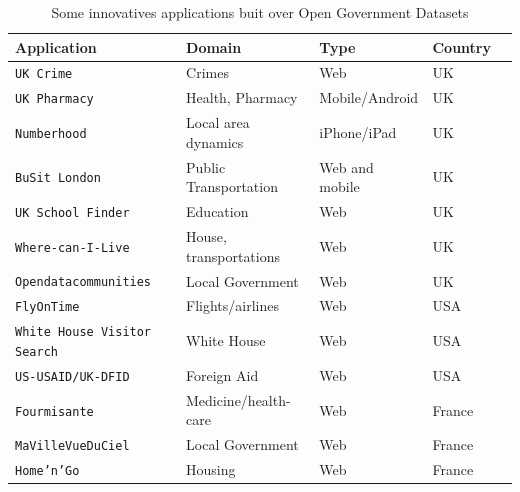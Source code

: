 \begin{table}[ht!b]
    \caption{Some innovatives applications buit over Open Government Datasets} \label{tab:apps-survey}
    \small
    \center
   \begin{tabularx}{\textwidth}{@{}llllX@{}}
    \toprule
    \textbf{Application} & \textbf{Domain} & \textbf{Type} &  \textbf{Country}  \\
    \toprule
    \texttt{UK Crime} &	Crimes & Web & UK  \\
    \midrule
\texttt{UK Pharmacy} & Health, Pharmacy  & Mobile/Android  & UK \\ 
	\midrule
	\texttt{Numberhood} & Local area dynamics  & iPhone/iPad & UK \\
	
	\midrule
	\texttt{BuSit London} & Public Transportation  & Web and mobile  & UK \\
	
	\midrule
	\texttt{UK School Finder} & Education  & Web  & UK \\
	
	\midrule
	\texttt{Where-can-I-Live} & House, transportations & Web  & UK \\
	\midrule
	
	\texttt{Opendatacommunities} & Local Government & Web  & UK \\
	\midrule
	
	\texttt{FlyOnTime } & Flights/airlines & Web  & USA \\
	\midrule
	
	\texttt{White House Visitor Search} & White House & Web  & USA \\
	\midrule
	
	\texttt{US-USAID/UK-DFID} & Foreign Aid & Web  & USA \\
	\midrule
	
	\texttt{Fourmisante} & Medicine/health-care & Web  & France \\
	\midrule
	
	\texttt{MaVilleVueDuCiel} & Local Government  & Web & France \\
	\midrule
	
	\texttt{Home'n'Go } & Housing & Web & France \\
	
	
    \bottomrule
  
    \end{tabularx}
    \end{table}
  

